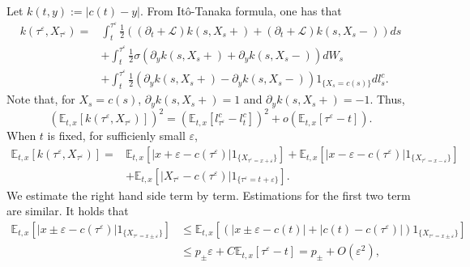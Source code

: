 \documentclass[11pt]{article}
\begin{document}
Let $k(t,y):=|c(t)-y|$. From It\^o-Tanaka formula, one has that
\begin{equation*}
\begin{split}
k(\tau^{\varepsilon},X_{\tau^{\varepsilon}})=&\int_t^{\tau^{\varepsilon}}\frac{1}{2} ((\partial_t+\mathcal L)k(s,X_s+)+(\partial_t+\mathcal L)k(s,X_s-))ds\\
&+\int_t^{\tau^{\varepsilon}}\frac12\sigma(\partial_yk(s,X_s+)+\partial_yk(s,X_s-))dW_s\\
&+\int_t^{\tau^{\varepsilon}}\frac12(\partial_y k(s,X_s+)-\partial_yk(s,X_s-))1_{\{X_s=c(s)\}}dl_s^c. 
\end{split}
\end{equation*}
Note that, for $X_s=c(s)$, $\partial_y k(s,X_s+)=1$ and $\partial_y k(s,X_s+)=-1$. Thus, 
\begin{equation}\label{est2}
  (\mathbb E_{t,x}[k(\tau^{\varepsilon},X_{\tau^{\varepsilon}})])^2=(\mathbb E_{t,x}[l^c_{\tau^{\varepsilon}}-l^c_t])^2+o(\mathbb E_{t,x}[\tau^{\varepsilon}-t]).  
\end{equation}
When $t$ is fixed, for sufficienly small $\varepsilon$,
\begin{equation*}
\begin{split}
    \mathbb E_{t,x}[k(\tau^{\varepsilon},X_{\tau^{\varepsilon}})]=&\mathbb E_{t,x}[|x+\varepsilon-c(\tau^{\varepsilon})|1_{\{X_{\tau^{\varepsilon}=x+\varepsilon}\}}]+\mathbb E_{t,x}[|x-\varepsilon-c(\tau^{\varepsilon})|1_{\{X_{\tau^{\varepsilon}=x-\varepsilon}\}}]\\
    &+\mathbb E_{t,x}[|X_{\tau^{\varepsilon}}-c(\tau^{\varepsilon})|1_{\{\tau^{\varepsilon}=t+\varepsilon\}}].
\end{split}
\end{equation*}
We estimate the right hand side term by term. Estimations for the first two term
are similar. It holds that 
\begin{equation*}
\begin{split}
\mathbb E_{t,x}[|x\pm \varepsilon-c(\tau^{\varepsilon})|1_{\{X_{\tau^{\varepsilon}=x\pm \varepsilon}\}}]&\le \mathbb E_{t,x}[\left(|x\pm \varepsilon-c(t)|+|c(t)-c(\tau^{\varepsilon})|\right)1_{\{X_{\tau^{\varepsilon}=x\pm \varepsilon}\}}]\\
&\le p_{\pm}\varepsilon+C\mathbb E_{t,x}[\tau^{\varepsilon}-t]=p_{\pm}+O(\varepsilon^2),
\end{split}
\end{equation*}
\end{document}
